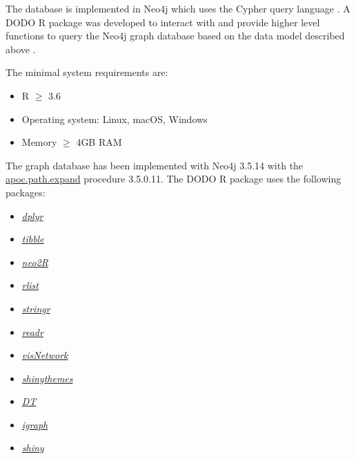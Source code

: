 \documentclass[9pt,a4paper,]{extarticle}
\begin{document}
The database is implemented in Neo4j which uses the Cypher query language \citep{Neo4j2020}. A DODO R package was developed to interact with and provide higher level functions to query the Neo4j graph database based on the data model described above \citep{R2019}.

The minimal system requirements are:

\begin{itemize}
\item
  R \(\geq\) 3.6
\item
  Operating system: Linux, macOS, Windows
\item
  Memory \(\geq\) 4GB RAM
\end{itemize}

The graph database has been implemented with Neo4j 3.5.14 \citep{Neo4j2020} with the \href{http://neo4j-contrib.github.io/neo4j-apoc-procedures/3.5/path-finding/path-expander/}{apoc.path.expand} procedure 3.5.0.11. The DODO R package uses the following packages:

\begin{itemize}
\item
  \emph{\href{https://CRAN.R-project.org/package=dplyr}{dplyr}} \citep{Wickham2019}
\item
  \emph{\href{https://CRAN.R-project.org/package=tibble}{tibble}} \citep{Muller2019}
\item
  \emph{\href{https://CRAN.R-project.org/package=neo2R}{neo2R}} \citep{Godard2018}
\item
  \emph{\href{https://CRAN.R-project.org/package=rlist}{rlist}} \citep{Ren2016}
\item
  \emph{\href{https://CRAN.R-project.org/package=stringr}{stringr}} \citep{Wickham2019b}
\item
  \emph{\href{https://CRAN.R-project.org/package=readr}{readr}} \citep{Wickham2018}
\item
  \emph{\href{https://CRAN.R-project.org/package=visNetwork}{visNetwork}} \citep{Almende2019}
\item
  \emph{\href{https://CRAN.R-project.org/package=shinythemes}{shinythemes}} \citep{Chang2018}
\item
  \emph{\href{https://CRAN.R-project.org/package=DT}{DT}} \citep{Xie2019}
\item
  \emph{\href{https://CRAN.R-project.org/package=igraph}{igraph}} \citep{Csardi2006}
\item
  \emph{\href{https://CRAN.R-project.org/package=shiny}{shiny}} \citep{Chang2019}
\end{itemize}
\end{document}
